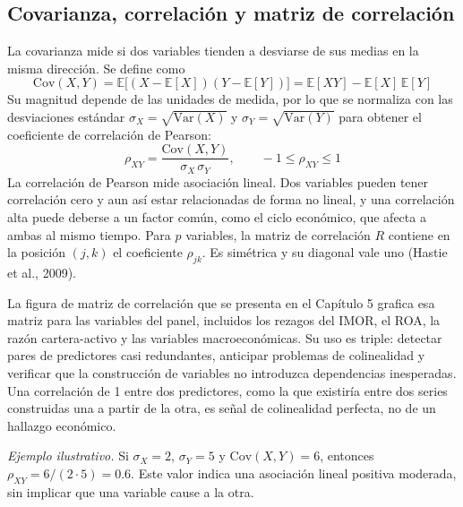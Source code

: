 \subsection{Covarianza, correlación y matriz de correlación}
La covarianza mide si dos variables tienden a desviarse de sus medias en la misma dirección. Se define como
\begin{equation}
\text{Cov}(X,Y)=\mathbb{E}\big[(X-\mathbb{E}[X])(Y-\mathbb{E}[Y])\big]=\mathbb{E}[XY]-\mathbb{E}[X]\,\mathbb{E}[Y]
\label{eq:covarianza}
\end{equation}
Su magnitud depende de las unidades de medida, por lo que se normaliza con las desviaciones estándar $\sigma_X=\sqrt{\text{Var}(X)}$ y $\sigma_Y=\sqrt{\text{Var}(Y)}$ para obtener el coeficiente de correlación de Pearson:
\begin{equation}
\rho_{XY}=\frac{\text{Cov}(X,Y)}{\sigma_X\,\sigma_Y}, \qquad -1\leq \rho_{XY}\leq 1
\label{eq:correlacion}
\end{equation}
La correlación de Pearson mide asociación lineal. Dos variables pueden tener correlación cero y aun así estar relacionadas de forma no lineal, y una correlación alta puede deberse a un factor común, como el ciclo económico, que afecta a ambas al mismo tiempo. Para $p$ variables, la matriz de correlación $R$ contiene en la posición $(j,k)$ el coeficiente $\rho_{jk}$. Es simétrica y su diagonal vale uno (Hastie et al., 2009).

La figura de matriz de correlación que se presenta en el Capítulo 5 grafica esa matriz para las variables del panel, incluidos los rezagos del IMOR, el ROA, la razón cartera-activo y las variables macroeconómicas. Su uso es triple: detectar pares de predictores casi redundantes, anticipar problemas de colinealidad y verificar que la construcción de variables no introduzca dependencias inesperadas. Una correlación de 1 entre dos predictores, como la que existiría entre dos series construidas una a partir de la otra, es señal de colinealidad perfecta, no de un hallazgo económico.

\textit{Ejemplo ilustrativo.} Si $\sigma_X=2$, $\sigma_Y=5$ y $\text{Cov}(X,Y)=6$, entonces $\rho_{XY}=6/(2\cdot 5)=0.6$. Este valor indica una asociación lineal positiva moderada, sin implicar que una variable cause a la otra.

